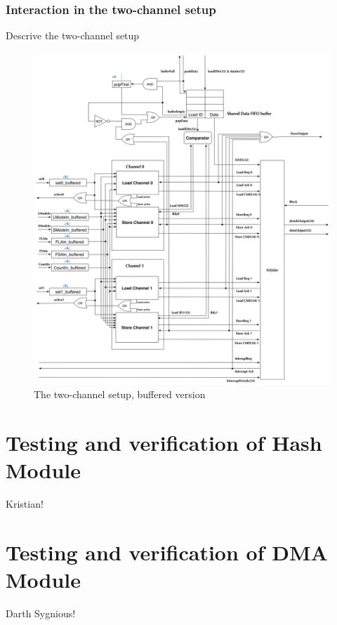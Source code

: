 \subsubsection{Interaction in the two-channel setup}
Descrive the two-channel setup
\begin{figure}[h!]
    \centering
    \includegraphics[width=1.25\textwidth]{Figures/DMA/TwoChannelSetUpBuffered}
    \caption{The two-channel setup, buffered version}
    \label{fig:twoChannelSetup}
\end{figure}


\section{Testing and verification of Hash Module}
Kristian!

\section{Testing and verification of DMA Module}
Darth Sygnious!

